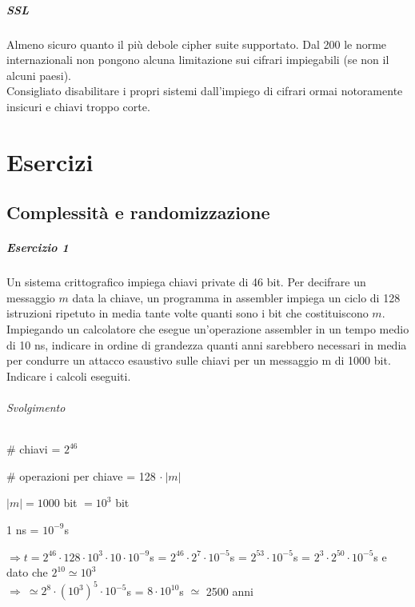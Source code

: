 \documentclass[10pt]{book}
\begin{document}
\paragraph{SSL} Almeno sicuro quanto il più debole cipher suite supportato. Dal 200 le norme internazionali non pongono alcuna limitazione sui cifrari impiegabili (se non il alcuni paesi).\\
Consigliato disabilitare i propri sistemi dall'impiego di cifrari ormai notoramente insicuri e chiavi troppo corte.
\chapter{Esercizi}
\section{Complessità e randomizzazione}
\paragraph{Esercizio 1} Un sistema crittografico impiega chiavi private di 46 bit. Per decifrare un messaggio $m$ data la
chiave, un programma in assembler impiega un ciclo di 128 istruzioni ripetuto in media tante volte
quanti sono i bit che costituiscono $m$. Impiegando un calcolatore che esegue un'operazione
assembler in un tempo medio di 10 ns, indicare in ordine di grandezza quanti anni sarebbero
necessari in media per condurre un attacco esaustivo sulle chiavi per un messaggio m di 1000 bit.\\
Indicare i calcoli eseguiti.
\subparagraph{Svolgimento} \begin{list}{}{}
	\item \# chiavi = $2^{46}$
	\item \# operazioni per chiave = 128 $\cdot\:|m|$
	\item $|m| = 1000$ bit $= 10^3$ bit
	\item 1 ns = $10^{-9}$s
	\item $\Rightarrow t = 2^{46}\cdot128\cdot10^3\cdot10\cdot10^{-9}$s = $2^{46}\cdot2^7\cdot10^{-5}$s = $2^{53}\cdot10^{-5}$s = $2^3\cdot2^{50}\cdot10^{-5}$s e dato che $2^{10} \simeq 10^3$\\
	$\Rightarrow\:\simeq 2^8\cdot(10^3)^5\cdot10^{-5}$s = $8\cdot10^{10}$s $\simeq$ 2500 anni
\end{list}
\end{document}
